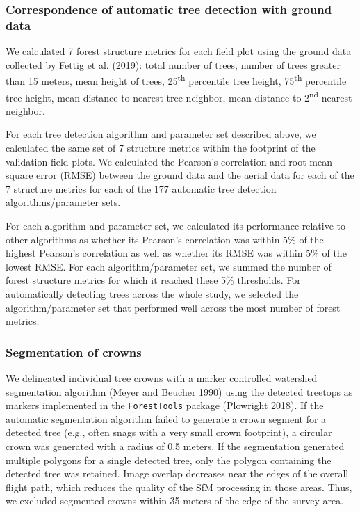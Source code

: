 \documentclass[]{article}
\begin{document}
\subsubsection{Correspondence of automatic tree detection with ground
data}\label{correspondence-of-automatic-tree-detection-with-ground-data}

We calculated 7 forest structure metrics for each field plot using the
ground data collected by Fettig et al. (2019): total number of trees,
number of trees greater than 15 meters, mean height of trees,
25\textsuperscript{th} percentile tree height, 75\textsuperscript{th}
percentile tree height, mean distance to nearest tree neighbor, mean
distance to 2\textsuperscript{nd} nearest neighbor.

For each tree detection algorithm and parameter set described above, we
calculated the same set of 7 structure metrics within the footprint of
the validation field plots. We calculated the Pearson's correlation and
root mean square error (RMSE) between the ground data and the aerial
data for each of the 7 structure metrics for each of the 177 automatic
tree detection algorithms/parameter sets.

For each algorithm and parameter set, we calculated its performance
relative to other algorithms as whether its Pearson's correlation was
within 5\% of the highest Pearson's correlation as well as whether its
RMSE was within 5\% of the lowest RMSE. For each algorithm/parameter
set, we summed the number of forest structure metrics for which it
reached these 5\% thresholds. For automatically detecting trees across
the whole study, we selected the algorithm/parameter set that performed
well across the most number of forest metrics.

\subsubsection{Segmentation of crowns}\label{segmentation-of-crowns}

We delineated individual tree crowns with a marker controlled watershed
segmentation algorithm (Meyer and Beucher 1990) using the detected
treetops as markers implemented in the \texttt{ForestTools} package
(Plowright 2018). If the automatic segmentation algorithm failed to
generate a crown segment for a detected tree (e.g., often snags with a
very small crown footprint), a circular crown was generated with a
radius of 0.5 meters. If the segmentation generated multiple polygons
for a single detected tree, only the polygon containing the detected
tree was retained. Image overlap decreases near the edges of the overall
flight path, which reduces the quality of the SfM processing in those
areas. Thus, we excluded segmented crowns within 35 meters of the edge
of the survey area.
\end{document}
